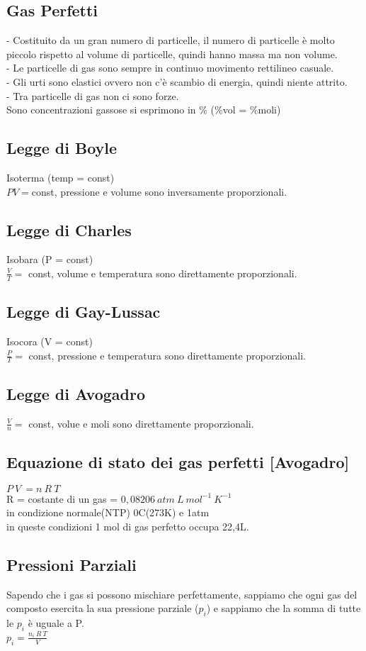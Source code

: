 \subsection{Gas Perfetti}
\tab- Costituito da un gran numero di particelle, il numero di particelle è molto piccolo rispetto al volume di particelle, quindi hanno massa ma non volume.\\
\tab- Le particelle di gas sono sempre in continuo movimento rettilineo casuale.\\
\tab- Gli urti sono elastici ovvero non c'è scambio di energia, quindi niente attrito.\\
\tab- Tra particelle di gas non ci sono forze.\\
Sono concentrazioni gassose si esprimono in \% (\%vol = \%moli)
\subsection{Legge di Boyle}
Isoterma (temp = const)\\
$PV = $const, pressione e volume sono inversamente proporzionali.
\subsection{Legge di Charles}
Isobara (P = const)\\
$\frac{V}{T} =$ const, volume e temperatura sono direttamente proporzionali.
\subsection{Legge di Gay-Lussac}
Isocora (V = const)\\
$\frac{P}{T} =$ const, pressione e temperatura sono direttamente proporzionali.
\subsection{Legge di Avogadro}
$\frac{V}{n} =$ const, volue e moli sono direttamente proporzionali.
\subsection{Equazione di stato dei gas perfetti [Avogadro]}
$P\ V\ = n\ R\ T$\\
R = costante di un gas = $0,08206\ atm\ L\ mol^{-1}\ K^{-1}$\\
in condizione normale(NTP) 0C(273K) e 1atm\\
in queste condizioni 1 mol di gas perfetto occupa 22,4L.
\subsection{Pressioni Parziali}
Sapendo che i gas si possono mischiare perfettamente, sappiamo che ogni gas del composto esercita la sua pressione parziale ($p_i$) e sappiamo che la somma di tutte le $p_i$ è uguale a P.\\
$p_i = \frac{n_i\ R\ T}{V}$\\
